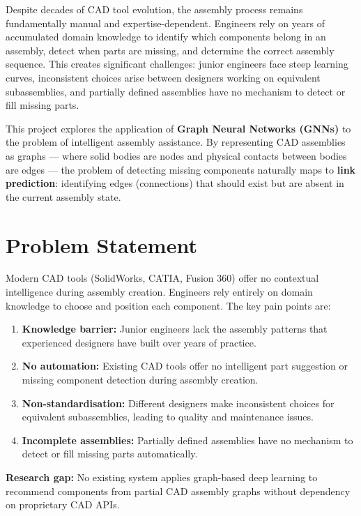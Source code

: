 \documentclass[12pt]{report}
\begin{document}
Despite decades of CAD tool evolution, the assembly process remains fundamentally manual and expertise-dependent. Engineers rely on years of accumulated domain knowledge to identify which components belong in an assembly, detect when parts are missing, and determine the correct assembly sequence. This creates significant challenges: junior engineers face steep learning curves, inconsistent choices arise between designers working on equivalent subassemblies, and partially defined assemblies have no mechanism to detect or fill missing parts.

This project explores the application of \textbf{Graph Neural Networks (GNNs)} to the problem of intelligent assembly assistance. By representing CAD assemblies as graphs --- where solid bodies are nodes and physical contacts between bodies are edges --- the problem of detecting missing components naturally maps to \textbf{link prediction}: identifying edges (connections) that should exist but are absent in the current assembly state.

\section{Problem Statement}

Modern CAD tools (SolidWorks, CATIA, Fusion 360) offer no contextual intelligence during assembly creation. Engineers rely entirely on domain knowledge to choose and position each component. The key pain points are:

\begin{enumerate}[label=\arabic*.]
    \item \textbf{Knowledge barrier:} Junior engineers lack the assembly patterns that experienced designers have built over years of practice.
    \item \textbf{No automation:} Existing CAD tools offer no intelligent part suggestion or missing component detection during assembly creation.
    \item \textbf{Non-standardisation:} Different designers make inconsistent choices for equivalent subassemblies, leading to quality and maintenance issues.
    \item \textbf{Incomplete assemblies:} Partially defined assemblies have no mechanism to detect or fill missing parts automatically.
\end{enumerate}

\textbf{Research gap:} No existing system applies graph-based deep learning to recommend components from partial CAD assembly graphs without dependency on proprietary CAD APIs.
\end{document}
